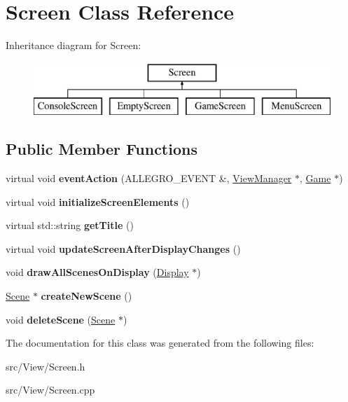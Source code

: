 \hypertarget{classScreen}{}\section{Screen Class Reference}
\label{classScreen}
Inheritance diagram for Screen\+:\begin{figure}[H]
\begin{center}
\leavevmode
\includegraphics[height=2.000000cm]{classScreen}
\end{center}
\end{figure}
\subsection*{Public Member Functions}
\begin{DoxyCompactItemize}
\item 
virtual void {\bfseries event\+Action} (A\+L\+L\+E\+G\+R\+O\+\_\+\+E\+V\+E\+NT \&, \hyperlink{classViewManager}{View\+Manager} $\ast$, \hyperlink{classGame}{Game} $\ast$)\hypertarget{classScreen_afd3d31073c6e790fcdc877eba8317e4a}{}\label{classScreen_afd3d31073c6e790fcdc877eba8317e4a}

\item 
virtual void {\bfseries initialize\+Screen\+Elements} ()\hypertarget{classScreen_a207320477f0e323dc4cd36dbd4706238}{}\label{classScreen_a207320477f0e323dc4cd36dbd4706238}

\item 
virtual std\+::string {\bfseries get\+Title} ()\hypertarget{classScreen_a28df2a95a64693e2e5b1238c07c92115}{}\label{classScreen_a28df2a95a64693e2e5b1238c07c92115}

\item 
virtual void {\bfseries update\+Screen\+After\+Display\+Changes} ()\hypertarget{classScreen_a0d283acd7432bd4fedd35cd147bdf4a8}{}\label{classScreen_a0d283acd7432bd4fedd35cd147bdf4a8}

\item 
void {\bfseries draw\+All\+Scenes\+On\+Display} (\hyperlink{classDisplay}{Display} $\ast$)\hypertarget{classScreen_ad576195d9b349d5a2af7844a638ff4e1}{}\label{classScreen_ad576195d9b349d5a2af7844a638ff4e1}

\item 
\hyperlink{classScene}{Scene} $\ast$ {\bfseries create\+New\+Scene} ()\hypertarget{classScreen_aee0fb634ec970fa915991093e98b0f34}{}\label{classScreen_aee0fb634ec970fa915991093e98b0f34}

\item 
void {\bfseries delete\+Scene} (\hyperlink{classScene}{Scene} $\ast$)\hypertarget{classScreen_a6a15f10596f89981974c0006e9768a9f}{}\label{classScreen_a6a15f10596f89981974c0006e9768a9f}

\end{DoxyCompactItemize}


The documentation for this class was generated from the following files\+:\begin{DoxyCompactItemize}
\item 
src/\+View/Screen.\+h\item 
src/\+View/Screen.\+cpp\end{DoxyCompactItemize}
